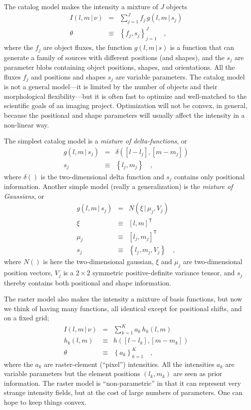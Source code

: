 \documentclass[12pt]{article}
\newcommand{\set}[1]{\left\{{#1}\right\}}
\newcommand{\given}{\,|\,}
\newcommand{\normal}{N}
\newcommand{\transpose}[1]{{#1}^{\!\mathsf{T}}}
\begin{document}
The catalog model makes the intensity a mixture of $J$ objects
\begin{eqnarray}
I(l,m\given\nu) &=& \sum_{j=1}^J f_j\,g(l,m\given s_j)
\\
\theta &\equiv& \set{f_j, s_j}_{j=1}^J
\quad,
\end{eqnarray}
where the $f_j$ are object fluxes, the function $g(l,m\given s)$ is a
function that can generate a family of sources with different
positions (and shapes), and the $s_j$ are parameter blobs containing
object positions, shapes, and orientations.  All the fluxes $f_j$ and
positions and shapes $s_j$ are variable parameters.  The catalog model
is not a general model---it is limited by the number of objects and
their morphological flexibility---but it is often fast to optimize and
well-matched to the scientific goals of an imaging project.
Optimization will not be convex, in general, because the positional
and shape parameters will usually affect the intensity in a non-linear
way.

The simplest catalog model is a \emph{mixture of delta-functions}, or
\begin{eqnarray}
g(l,m\given s_j) &=& \delta([l-l_j], [m-m_j])
\\
s_j &\equiv& \set{l_j, m_j}
\quad,
\end{eqnarray}
where $\delta()$ is the two-dimensional delta function and $s_j$
contains only positional information.  Another simple model (really a
generalization) is the \emph{mixture of Gaussians}, or
\begin{eqnarray}
g(l,m\given s_j) &=& \normal(\xi\given\mu_j,V_j)
\\
\xi &\equiv& \transpose{[l, m]}
\\
\mu_j &\equiv& \transpose{[l_j, m_j]}
\\
s_j &\equiv& \set{l_j, m_j, V_j}
\quad,
\end{eqnarray}
where $\normal()$ is here the two-dimensional gaussian, $\xi$ and
$\mu_j$ are two-dimensional position vectors, $V_j$ is a $2\times 2$
symmetric positive-definite variance tensor, and $s_j$ thereby
contains both positional and shape information.

The raster model also makes the intensity a mixture of basis
functions, but now we think of having many functions, all identical
except for positional shifts, and on a fixed grid;
\begin{eqnarray}
I(l,m\given\nu) &=& \sum_{k=1}^K a_k\,h_k(l,m)
\\
h_k(l,m) &\equiv& h([l-l_k], [m-m_k])
\\
\theta &\equiv& \set{a_k}_{k=1}^K
\quad,
\end{eqnarray}
where the $a_k$ are raster-element (``pixel'') intensities.  All the
intensities $a_k$ are variable parameters but the element positions
$(l_k, m_k)$ are seen as prior information.  The raster model is
``non-parametric'' in that it can represent very strange intensity
fields, but at the cost of large numbers of parameters.  One can hope
to keep things convex.
\end{document}
